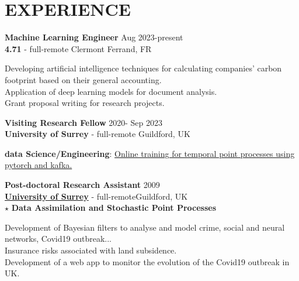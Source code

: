 \documentclass[11 pt,oneside,a4paper,titlepage]{article}
\begin{document}
{\begin{minipage}{12.3cm}
        \vspace*{-0.22cm}

        \section*{EXPERIENCE}

        \textbf{Machine Learning Engineer} \hfill Aug 2023\--present\\
        \textbf{4.71} \-- full-remote \hfill Clermont Ferrand, FR\\

        \vspace*{-0.2cm}
        \hspace*{0.2cm}
        \begin{minipage}{12cm}
            {\bullet} Developing artificial intelligence techniques for calculating companies' carbon footprint based on their general accounting.\\
            {\bullet} Application of deep learning models for document analysis.\\
            {\bullet} Grant proposal writing for research projects.\\
        \end{minipage}

        \textbf{Visiting Research Fellow} \hfill 2020\-- Sep 2023\\
        \textbf{University of Surrey} \-- full-remote \hfill Guildford, UK\\

        \vspace*{-0.2cm}
        \hspace*{0.2cm}
        \begin{minipage}{12cm}
            {\bullet} \textbf{data Science/Engineering}: \href{https://sdelahaies.github.io/enpgf-lab.html}{Online training for temporal point processes using pytorch and kafka.}\\
        \end{minipage}

        \textbf{Post-doctoral Research Assistant} \hfill 2009\\
        \textbf{\href{https://www.surrey.ac.uk/department-mathematics}{University of Surrey}} \-- full-remote\hfill Guildford, UK\\
        $\star$ \textbf{Data Assimilation and Stochastic Point Processes}\\

        \vspace*{-0.2cm}
        \hspace*{0.2cm}
        \begin{minipage}{12cm}
            {\bullet} Development of Bayesian filters to analyse and model crime, social and neural networks, Covid19 outbreak...\\
            {\bullet} Insurance risks associated with land subsidence.\\
            {\bullet} Development of a web app to monitor the evolution of the Covid19 outbreak in UK.\\
        \end{minipage}


\end{minipage}}
\end{document}

